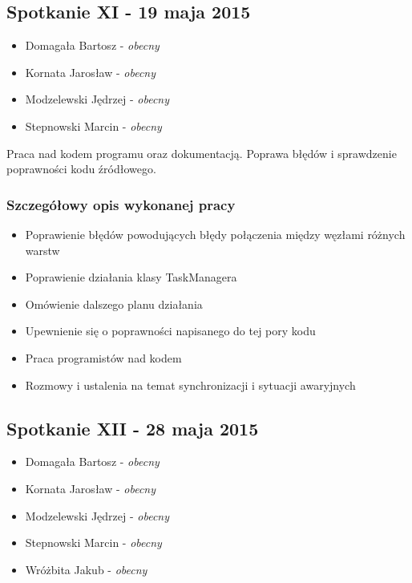 \subsection[Spotkanie XI - 19 maja 2015]{Spotkanie XI - 19 maja 2015}

\begin{itemize}
\item Domagała Bartosz - \textit{obecny}
\item Kornata Jarosław - \textit{obecny}
\item Modzelewski Jędrzej - \textit{obecny}
\item Stepnowski Marcin - \textit{obecny}
\end{itemize}

\par{Praca nad kodem programu oraz dokumentacją. Poprawa błędów i sprawdzenie poprawności kodu źródłowego.}

\subsubsection*[Szczegółowy opis wykonanej pracy]{Szczegółowy opis wykonanej pracy}
\begin{itemize}
\item Poprawienie błędów powodujących błędy połączenia między węzłami różnych warstw
\item Poprawienie działania klasy TaskManagera
\item Omówienie dalszego planu działania
\item Upewnienie się o poprawności napisanego do tej pory kodu
\item Praca programistów nad kodem
\item Rozmowy i ustalenia na temat synchronizacji i sytuacji awaryjnych
\end{itemize}

\subsection[Spotkanie XII - 28 maja 2015]{Spotkanie XII - 28 maja 2015}

\begin{itemize}
\item Domagała Bartosz - \textit{obecny}
\item Kornata Jarosław - \textit{obecny}
\item Modzelewski Jędrzej - \textit{obecny}
\item Stepnowski Marcin - \textit{obecny}
\item Wróżbita Jakub - \textit{obecny}
\end{itemize}

